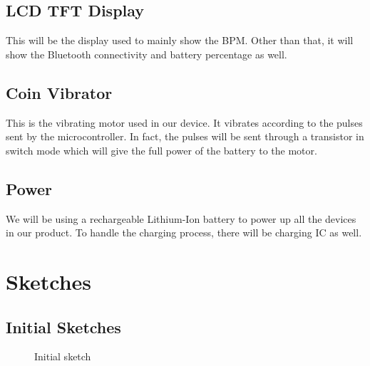 \documentclass{article}
\begin{document}
        \subsection{LCD TFT Display}
        This will be the display used to mainly show the BPM. Other than that, it will show the Bluetooth connectivity and battery percentage as well.

        \subsection{Coin Vibrator}
        This is the vibrating motor used in our device. It vibrates according to the pulses sent by the microcontroller. In fact, the pulses will be sent through a transistor in switch mode which will give the full power of the battery to the motor.

        \subsection{Power}
        We will be using a rechargeable Lithium-Ion battery to power up all the devices in our product. To handle the charging process, there will be charging IC as well.

        \section{Sketches}
        \subsection{Initial Sketches}
            \begin{figure}[!htb]
                \centering
                \caption{Initial sketch}
            \end{figure}
\end{document}
